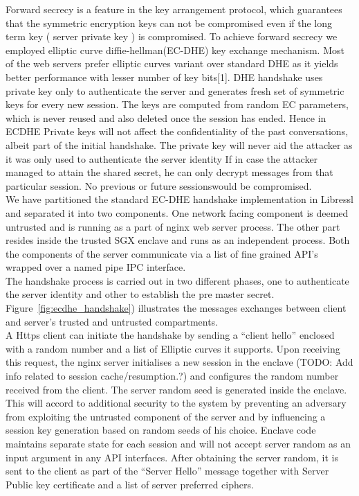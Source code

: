 \documentclass[../../main.tex]{subfiles}
\begin{document}
Forward secrecy is a feature in the key arrangement protocol, which
guarantees that the symmetric encryption keys can not be compromised
even if the long term key ( server private key ) is compromised. To
achieve forward secrecy we employed elliptic curve
diffie-hellman(EC-DHE) key exchange mechanism. Most of the web servers
prefer elliptic curves variant over standard DHE as it yields better
performance with lesser number of key bits[1]. DHE handshake uses
private key only to authenticate the server and generates fresh set of
symmetric keys for every new session. The keys are computed from
random EC parameters, which is never reused and also deleted once the
session has ended. Hence in ECDHE Private keys will not affect the
confidentiality of the past conversations, albeit part of the initial
handshake. The private key will never aid the attacker as it was only
used to authenticate the server identity If in case the attacker
managed to attain the shared secret, he can only decrypt messages from
that particular session. No previous or future
sessionswould be compromised.\\

\noindent
We have partitioned the standard EC-DHE handshake implementation in
Libressl and separated it into two components. One network facing
component is deemed untrusted and is running as a part of nginx web
server process. The other part resides inside the trusted SGX enclave
and runs as an independent process. Both the components of the server
communicate via a list of fine grained API’s
wrapped over a named pipe IPC interface.\\

\noindent
The handshake process is carried out in two different phases, one to
authenticate the server identity and other to establish the pre master
secret. Figure~\ref{fig:ecdhe_handshake}) illustrates the messages
exchanges between client and server’s trusted and untrusted compartments.\\

\noindent
A Https client can initiate the handshake by sending a “client hello”
enclosed with a random number and a list of Elliptic curves it
supports. Upon receiving this request, the nginx server initialises a
new session in the enclave (TODO: Add info related to session
cache/resumption.?) and configures the random number received from the
client. The server random seed is generated inside the enclave. This
will accord to additional security to the system by preventing an
adversary from exploiting the untrusted component of the server and by
influencing a session key generation based on random seeds of his
choice. Enclave code maintains separate state for each session and
will not accept server random as an input argument in any API
interfaces. After obtaining the server random, it is sent to the
client as part of the “Server Hello” message together with Server
Public key certificate and a list of server preferred ciphers.
\end{document}
